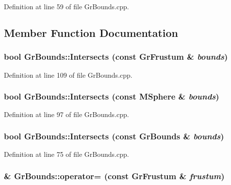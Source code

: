Definition at line 59 of file GrBounds.cpp.

\subsection{Member Function Documentation}
\hypertarget{class_gr_bounds_6b254718d7b9e125d7f53b950a7f3a77}{
\subsubsection[{Intersects}]{\setlength{\rightskip}{0pt plus 5cm}bool GrBounds::Intersects (const {\bf GrFrustum} \& {\em bounds})}}
\label{class_gr_bounds_6b254718d7b9e125d7f53b950a7f3a77}




Definition at line 109 of file GrBounds.cpp.\hypertarget{class_gr_bounds_db5280ffd3439b0373f2f0be3726eac3}{
\subsubsection[{Intersects}]{\setlength{\rightskip}{0pt plus 5cm}bool GrBounds::Intersects (const {\bf MSphere} \& {\em bounds})}}
\label{class_gr_bounds_db5280ffd3439b0373f2f0be3726eac3}




Definition at line 97 of file GrBounds.cpp.\hypertarget{class_gr_bounds_194728e6b450789f0b5b1e5e75dfe823}{
\subsubsection[{Intersects}]{\setlength{\rightskip}{0pt plus 5cm}bool GrBounds::Intersects (const {\bf GrBounds} \& {\em bounds})}}
\label{class_gr_bounds_194728e6b450789f0b5b1e5e75dfe823}




Definition at line 75 of file GrBounds.cpp.\hypertarget{class_gr_bounds_4c11fbe01c84a5770516da4cc85d1e38}{
\subsubsection[{operator=}]{ \& GrBounds::operator= (const {\bf GrFrustum} \& {\em frustum})}}
\label{class_gr_bounds_4c11fbe01c84a5770516da4cc85d1e38}




